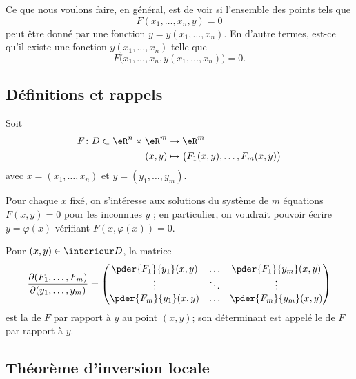 Ce que nous voulons faire, en général, est de voir si l'ensemble des points tels que
\begin{equation}
	F(x_1,\ldots,x_n,y)=0
\end{equation}
peut être donné par une fonction $y=y(x_1,\ldots,x_n)$. En d'autre termes, est-ce qu'il existe une fonction $y(x_1,\ldots,x_n)$ telle que
\begin{equation}
	F\big( x_1,\ldots,x_n,y(x_1,\ldots,x_n)\big)=0.
\end{equation}



\subsection{Définitions et rappels}
Soit
\begin{equation}
    \begin{aligned}
        F\colon D\subset \eR^n\times \eR^m&\to \eR^m \\
        (x,y)&\mapsto \big( F_1(x,y),\ldots, F_m(x,y) \big) 
    \end{aligned}
\end{equation}
avec $x = (x_1,\ldots, x_n)$ et $y = (y_1,\ldots,y_m)$.

Pour chaque $x$ fixé, on s'intéresse aux solutions du système de $m$
 équations $F(x,y) = 0$ pour les inconnues $y$ ; en particulier, on
 voudrait pouvoir écrire $y = \varphi(x)$ vérifiant $F(x,\varphi(x)) = 0$.

Pour $(x,y) \in \interieur D$, la matrice
\begin{equation}
    \frac{ \partial (F_1,\ldots, F_m) }{ \partial (y_1,\ldots, y_m) }=
\begin{pmatrix}
\pder {F_1}{y_1}(x,y)& \ldots& \pder {F_1}{y_m}(x,y)\\
\vdots& \ddots & \vdots\\
\pder {F_m}{y_1}(x,y)& \ldots& \pder {F_m}{y_m}(x,y)\\
\end{pmatrix}
\end{equation}
est la  de $F$ par rapport à $y$ au point
$(x,y)$; son déterminant est appelé le  de $F$ par
rapport à $y$.

\subsection{Théorème d'inversion locale}

